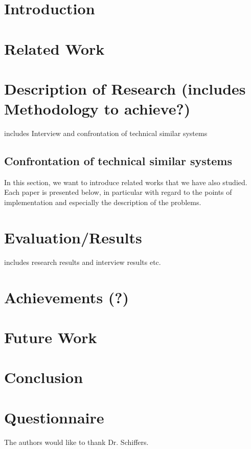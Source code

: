 
\section{Introduction}


\section{Related Work}



\section{Description of Research (includes Methodology to achieve?)}

includes Interview and confrontation of technical similar systems

\subsection{Confrontation of technical similar systems}
In this section, we want to introduce related works that we have also studied.
Each paper is presented below, in particular with regard to the points of implementation and especially the description of the problems.



\section{Evaluation/Results}

includes research results and interview results etc.


\section{Achievements (?)}



\section{Future Work}


\section{Conclusion}




\appendix
\section{Questionnaire}



\begin{acks}

The authors would like to thank Dr. Schiffers.



\end{acks}



